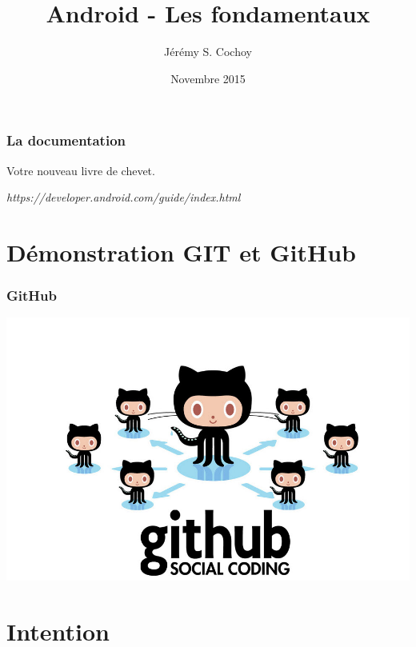 \documentclass{beamer}
\begin{document}
\title{Android - Les fondamentaux}
\author{Jérémy S. Cochoy}
\date{Novembre 2015}


\begin{frame}
\titlepage
\end{frame}

\begin{frame}
\tableofcontents
\end{frame}

\begin{frame}
\frametitle{La documentation}

\begin{block}{Votre nouveau livre de chevet.}
\begin{center}
\emph{https://developer.android.com/guide/index.html}
\end{center}
\end{block}

\end{frame}

\section{Démonstration GIT et GitHub}

\begin{frame}
\frametitle{GitHub}
\begin{center}
\includegraphics[scale=0.4]{github.jpg}
\end{center}
\end{frame}

\section{Intention}
\end{document}
